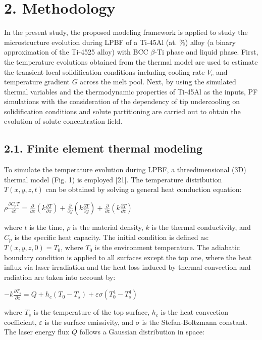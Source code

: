 \documentclass[10pt]{article}
\begin{document}
\section*{2. Methodology}
In the present study, the proposed modeling framework is applied to study the microstructure evolution during LPBF of a Ti-45Al (at. \%) alloy (a binary approximation of the Ti-4525 alloy) with BCC $\beta$-Ti phase and liquid phase. First, the temperature evolutions obtained from the thermal model are used to estimate the transient local solidification conditions including cooling rate $V_{c}$ and temperature gradient $G$ across the melt pool. Next, by using the simulated thermal variables and the thermodynamic properties of Ti-45Al as the inputs, PF simulations with the consideration of the dependency of tip undercooling on solidification conditions and solute partitioning are carried out to obtain the evolution of solute concentration field.

\subsection*{2.1. Finite element thermal modeling}
To simulate the temperature evolution during LPBF, a threedimensional (3D) thermal model (Fig. 1) is employed [21]. The temperature distribution $T(x, y, z, t)$ can be obtained by solving a general heat conduction equation:

$\rho \frac{\partial C_{p} T}{\partial t}=\frac{\partial}{\partial x}\left(k \frac{\partial T}{\partial x}\right)+\frac{\partial}{\partial y}\left(k \frac{\partial T}{\partial y}\right)+\frac{\partial}{\partial z}\left(k \frac{\partial T}{\partial z}\right)$

where $t$ is the time, $\rho$ is the material density, $k$ is the thermal conductivity, and $C_{p}$ is the specific heat capacity. The initial condition is defined as: $T(x, y, z, 0)=T_{0}$, where $T_{0}$ is the environment temperature. The adiabatic boundary condition is applied to all surfaces except the top one, where the heat influx via laser irradiation and the heat loss induced by thermal convection and radiation are taken into account by:

$-k \frac{\partial T_{s}}{\partial z}=Q+h_{c}\left(T_{0}-T_{s}\right)+\varepsilon \sigma\left(T_{0}^{4}-T_{s}^{4}\right)$

where $T_{s}$ is the temperature of the top surface, $h_{c}$ is the heat convection coefficient, $\varepsilon$ is the surface emissivity, and $\sigma$ is the Stefan-Boltzmann constant. The laser energy flux $Q$ follows a Gaussian distribution in space:
\end{document}
